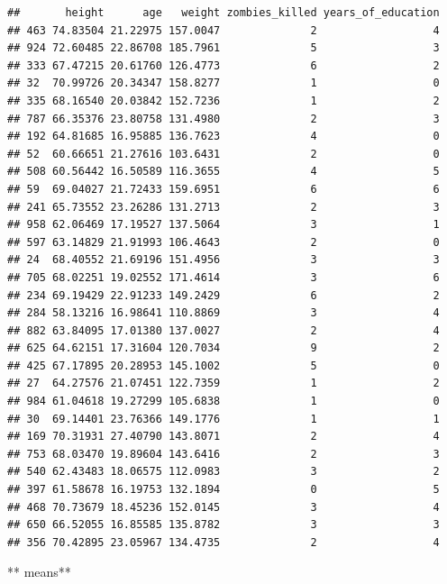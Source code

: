 \documentclass[]{article}
\newenvironment{Shaded}{\begin{snugshade}}{\end{snugshade}}
\newcommand{\KeywordTok}[1]{\textcolor[rgb]{0.13,0.29,0.53}{\textbf{#1}}}
\newcommand{\StringTok}[1]{\textcolor[rgb]{0.31,0.60,0.02}{#1}}
\newcommand{\OperatorTok}[1]{\textcolor[rgb]{0.81,0.36,0.00}{\textbf{#1}}}
\newcommand{\NormalTok}[1]{#1}
\begin{document}
\begin{verbatim}
##       height      age   weight zombies_killed years_of_education
## 463 74.83504 21.22975 157.0047              2                  4
## 924 72.60485 22.86708 185.7961              5                  3
## 333 67.47215 20.61760 126.4773              6                  2
## 32  70.99726 20.34347 158.8277              1                  0
## 335 68.16540 20.03842 152.7236              1                  2
## 787 66.35376 23.80758 131.4980              2                  3
## 192 64.81685 16.95885 136.7623              4                  0
## 52  60.66651 21.27616 103.6431              2                  0
## 508 60.56442 16.50589 116.3655              4                  5
## 59  69.04027 21.72433 159.6951              6                  6
## 241 65.73552 23.26286 131.2713              2                  3
## 958 62.06469 17.19527 137.5064              3                  1
## 597 63.14829 21.91993 106.4643              2                  0
## 24  68.40552 21.69196 151.4956              3                  3
## 705 68.02251 19.02552 171.4614              3                  6
## 234 69.19429 22.91233 149.2429              6                  2
## 284 58.13216 16.98641 110.8869              3                  4
## 882 63.84095 17.01380 137.0027              2                  4
## 625 64.62151 17.31604 120.7034              9                  2
## 425 67.17895 20.28953 145.1002              5                  0
## 27  64.27576 21.07451 122.7359              1                  2
## 984 61.04618 19.27299 105.6838              1                  0
## 30  69.14401 23.76366 149.1776              1                  1
## 169 70.31931 27.40790 143.8071              2                  4
## 753 68.03470 19.89604 143.6416              2                  3
## 540 62.43483 18.06575 112.0983              3                  2
## 397 61.58678 16.19753 132.1894              0                  5
## 468 70.73679 18.45236 152.0145              3                  4
## 650 66.52055 16.85585 135.8782              3                  3
## 356 70.42895 23.05967 134.4735              2                  4
\end{verbatim}

** means**

\begin{Shaded}
\end{Shaded}
\end{document}
